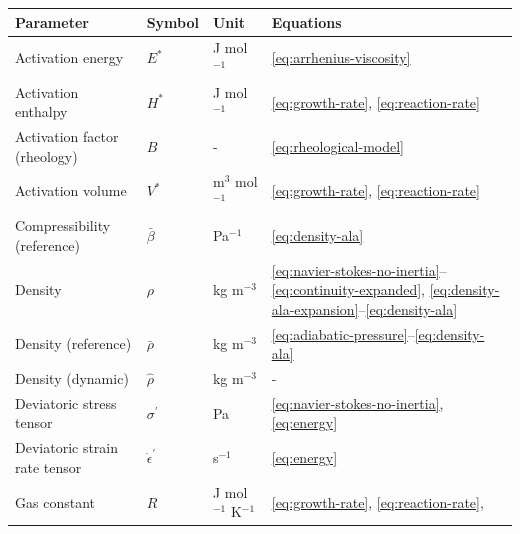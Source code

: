 \documentclass[draft,linenumbers]{agujournal2019}
\newcounter{none}
\begin{document}
{\def\LTcaptype{none} %
\begin{longtable}[]{@{}
  >{\raggedright\arraybackslash}p{}
  >{\raggedright\arraybackslash}p{}
  >{\raggedright\arraybackslash}p{}
  >{\raggedright\arraybackslash}p{}@{}}
\toprule\noalign{}
\begin{minipage}[b]{\linewidth}\raggedright
Parameter
\end{minipage} & \begin{minipage}[b]{\linewidth}\raggedright
Symbol
\end{minipage} & \begin{minipage}[b]{\linewidth}\raggedright
Unit
\end{minipage} & \begin{minipage}[b]{\linewidth}\raggedright
Equations
\end{minipage} \\
\midrule\noalign{}
\endhead
\bottomrule\noalign{}
\endlastfoot
Activation energy & \(E^{\ast}\) & J mol\(^{-1}\) &
\ref{eq:arrhenius-viscosity} \\
Activation enthalpy & \(H^{\ast}\) & J mol\(^{-1}\) &
\ref{eq:growth-rate}, \ref{eq:reaction-rate} \\
Activation factor (rheology) & \(B\) & - & \ref{eq:rheological-model} \\
Activation volume & \(V^{\ast}\) & m\(^3\) mol\(^{-1}\) &
\ref{eq:growth-rate}, \ref{eq:reaction-rate} \\
Compressibility (reference) & \(\bar{\beta}\) & Pa\(^{-1}\) &
\ref{eq:density-ala} \\
Density & \(\rho\) & kg m\(^{-3}\) &
\ref{eq:navier-stokes-no-inertia}--\ref{eq:continuity-expanded},
\ref{eq:density-ala-expansion}--\ref{eq:density-ala} \\
Density (reference) & \(\bar{\rho}\) & kg m\(^{-3}\) &
\ref{eq:adiabatic-pressure}--\ref{eq:density-ala} \\
Density (dynamic) & \(\hat{\rho}\) & kg m\(^{-3}\) & - \\
Deviatoric stress tensor & \(\sigma^{\prime}\) & Pa &
\ref{eq:navier-stokes-no-inertia}, \ref{eq:energy} \\
Deviatoric strain rate tensor & \(\dot{\epsilon}^{\prime}\) & s\(^{-1}\)
& \ref{eq:energy} \\
Gas constant & \(R\) & J mol\(^{-1}\) K\(^{-1}\) & \ref{eq:growth-rate},
\ref{eq:reaction-rate},

\end{longtable}}
\end{document}
